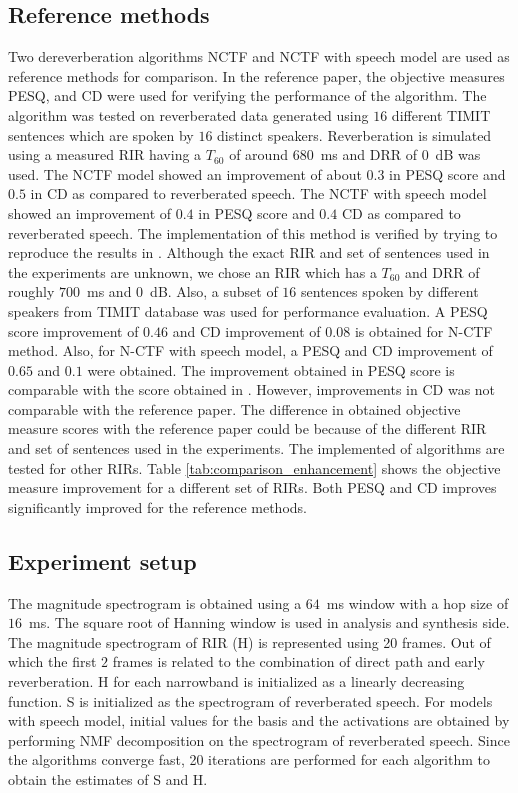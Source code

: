 \subsection{Reference methods}
Two dereverberation algorithms NCTF and NCTF with speech model \cite{mohammadiha2016speech} are used as reference methods for comparison. In the reference paper, the objective measures PESQ, and CD were used for verifying the performance of the algorithm. The algorithm was tested on reverberated data generated using $16$ different TIMIT sentences which are spoken by $16$ distinct speakers. Reverberation is simulated using a measured RIR having a $T_{60}$ of around $680$~ms and DRR of $0$~dB was used. The NCTF model showed an improvement of about $0.3$ in PESQ score and $0.5$ in CD as compared to reverberated speech. The NCTF with speech model showed an improvement of $0.4$ in PESQ score and $0.4$ CD as compared to reverberated speech. The implementation of this method is verified by trying to reproduce the results in \cite{mohammadiha2016speech}. Although the exact RIR and set of sentences used in the experiments are unknown, we chose an RIR which has a $T_{60}$ and DRR of roughly $700$~ms and $0$~dB. Also, a subset of $16$ sentences spoken by different speakers from TIMIT database was used for performance evaluation. A PESQ score improvement of $0.46$ and CD improvement of $0.08$ is obtained for N-CTF method. Also, for N-CTF with speech model, a PESQ and CD improvement of $0.65$ and $0.1$ were obtained. The improvement obtained in PESQ score is comparable with the score obtained in \cite{mohammadiha2016speech}. However, improvements in CD was not comparable with the reference paper. The difference in obtained objective measure scores with the reference paper could be because of the different RIR and set of sentences used in the experiments. The implemented of algorithms are tested for other RIRs. Table \ref{tab:comparison_enhancement} shows the objective measure improvement for a different set of RIRs. Both PESQ and CD improves significantly improved for the reference methods. 
\subsection{Experiment setup}
The magnitude spectrogram is obtained using a $64$~ms window with a hop size of $16$~ms. The square root of Hanning window is used in analysis and synthesis side. The magnitude spectrogram of RIR (H) is represented using 20 frames. Out of which the first $2$ frames is related to the combination of direct path and early reverberation. H for each narrowband is initialized as a linearly decreasing function. S is initialized as the spectrogram of reverberated speech. For models with speech model, initial values for the basis and the activations are obtained by performing NMF decomposition on the spectrogram of reverberated speech. Since the algorithms converge fast, 20 iterations are performed for each algorithm to obtain the estimates of S and H.

